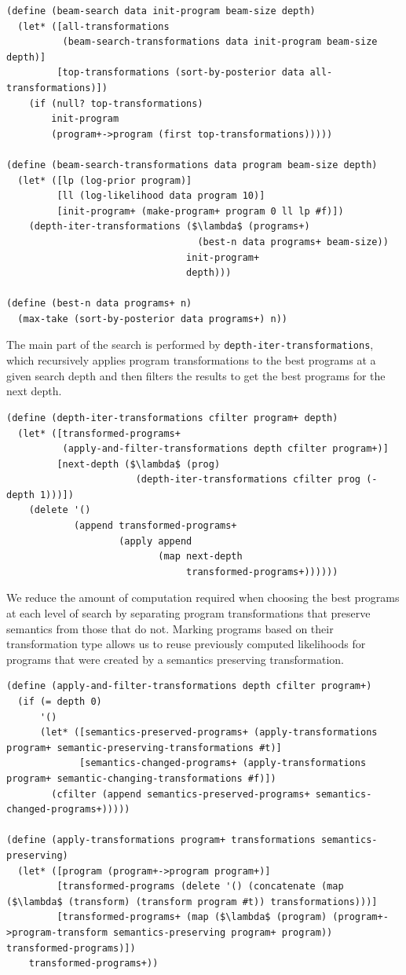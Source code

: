 \documentclass[a4paper,10pt]{article}
\begin{document}
\begin{lstlisting}[frame=trbl]
(define (beam-search data init-program beam-size depth)
  (let* ([all-transformations
          (beam-search-transformations data init-program beam-size depth)]
         [top-transformations (sort-by-posterior data all-transformations)])
    (if (null? top-transformations)
        init-program
        (program+->program (first top-transformations)))))

(define (beam-search-transformations data program beam-size depth)
  (let* ([lp (log-prior program)]
         [ll (log-likelihood data program 10)]
         [init-program+ (make-program+ program 0 ll lp #f)])
    (depth-iter-transformations ($\lambda$ (programs+)
                                  (best-n data programs+ beam-size))
                                init-program+
                                depth)))

(define (best-n data programs+ n)
  (max-take (sort-by-posterior data programs+) n))
\end{lstlisting}
The main part of the search is performed by \texttt{depth-iter-transformations}, which recursively applies program transformations to the best programs at a given search depth and then filters the results to get the best programs for the next depth.
\begin{lstlisting}[frame=trbl]
(define (depth-iter-transformations cfilter program+ depth)
  (let* ([transformed-programs+
          (apply-and-filter-transformations depth cfilter program+)]
         [next-depth ($\lambda$ (prog)
                       (depth-iter-transformations cfilter prog (- depth 1)))])
    (delete '()
            (append transformed-programs+
                    (apply append
                           (map next-depth
                                transformed-programs+))))))
\end{lstlisting}
We reduce the amount of computation required when choosing the best programs at each level of search by separating program transformations that preserve semantics from those that do not.  Marking programs based on their transformation type allows us to reuse previously computed likelihoods for programs that were created by a semantics preserving transformation.
\begin{lstlisting}[frame=trbl]
(define (apply-and-filter-transformations depth cfilter program+)
  (if (= depth 0)
      '()
      (let* ([semantics-preserved-programs+ (apply-transformations program+ semantic-preserving-transformations #t)]
             [semantics-changed-programs+ (apply-transformations program+ semantic-changing-transformations #f)])
        (cfilter (append semantics-preserved-programs+ semantics-changed-programs+)))))

(define (apply-transformations program+ transformations semantics-preserving)
  (let* ([program (program+->program program+)]
         [transformed-programs (delete '() (concatenate (map ($\lambda$ (transform) (transform program #t)) transformations)))]
         [transformed-programs+ (map ($\lambda$ (program) (program+->program-transform semantics-preserving program+ program)) transformed-programs)])
    transformed-programs+))
\end{lstlisting}
\end{document}
